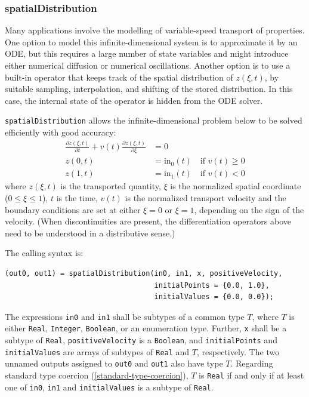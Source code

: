 \subsubsection{spatialDistribution}\label{spatialdistribution}

\begin{nonnormative}
Many applications involve the modelling of variable-speed transport of properties.
One option to model this infinite-dimensional system is to approximate it by an ODE, but this requires a large number of state variables and might introduce either numerical diffusion or numerical oscillations.
Another option is to use a built-in operator that keeps track of the spatial distribution of $z(\xi, t)$, by suitable sampling, interpolation, and shifting of the stored distribution.
In this case, the internal state of the operator is hidden from the ODE solver.
\end{nonnormative}

\lstinline!spatialDistribution! allows the infinite-dimensional problem below to be solved efficiently with good accuracy:
\begin{align*}
\frac{\partial z(\xi, t)}{\partial t} + v(t) \frac{\partial z(\xi, t)}{\partial \xi} &= 0\\
z(0, t) &= \mathrm{in}_{0}(t) \quad \text{if $v(t) \geq 0$}\\
z(1, t) &= \mathrm{in}_{1}(t) \quad \text{if $v(t) < 0$}
\end{align*}
where $z(\xi, t)$ is the transported quantity, $\xi$ is the normalized spatial coordinate ($0 \le \xi \le 1$), $t$ is the time, $v(t)$ is the normalized transport velocity and the boundary conditions are set at either $\xi = 0$ or $\xi = 1$, depending on the sign of the velocity.
(When discontinuities are present, the differentiation operators above need to be understood in a distributive sense.)

The calling syntax is:
\begin{lstlisting}[language=modelica]
(out0, out1) = spatialDistribution(in0, in1, x, positiveVelocity,
                                   initialPoints = {0.0, 1.0},
                                   initialValues = {0.0, 0.0});
\end{lstlisting}
The expressions \lstinline!in0! and \lstinline!in1! shall be subtypes of a common type $T$, where $T$ is either \lstinline!Real!, \lstinline!Integer!, \lstinline!Boolean!, or an enumeration type.
Further, \lstinline!x! shall be a subtype of \lstinline!Real!, \lstinline!positiveVelocity! is a \lstinline!Boolean!, and \lstinline!initialPoints! and \lstinline!initialValues! are arrays of subtypes of \lstinline!Real! and $T$, respectively.
The two unnamed outputs assigned to \lstinline!out0! and \lstinline!out1! also have type $T$.
Regarding standard type coercion (\cref{standard-type-coercion}), $T$ is \lstinline!Real! if and only if at least one of \lstinline!in0!, \lstinline!in1! and \lstinline!initialValues! is a subtype of \lstinline!Real!.

